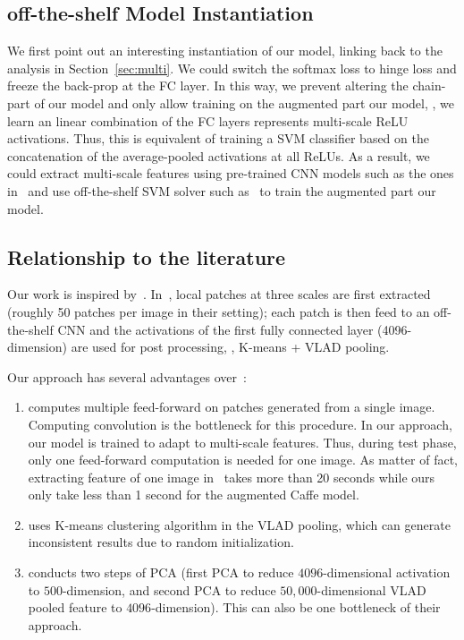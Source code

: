 \documentclass[10pt,twocolumn,letterpaper]{article}
\begin{document}
\subsection{off-the-shelf Model Instantiation}

We first point out an interesting instantiation of our model, linking back to the analysis in Section~\ref{sec:multi}. We could switch the softmax loss to hinge loss and freeze the back-prop at the FC layer. In this way, we prevent altering the chain-part of our model and only allow training on the augmented part our model, \ie, we learn an linear combination of the FC layers represents multi-scale ReLU activations. Thus, this is equivalent of training a SVM classifier based on the concatenation of the average-pooled activations at all ReLUs. As a result, we could extract multi-scale features using pre-trained CNN models such as the ones in~\cite{AlexNet, veryDeep} and use off-the-shelf SVM solver such as~\cite{liblinear} to train the augmented part our model.

\subsection{Relationship to the literature}

Our work is inspired by~\cite{Gong14}. In~\cite{Gong14}, local patches at three scales are first extracted (roughly 50 patches per image in their setting); each patch is then feed to an off-the-shelf CNN and the activations of the first fully connected layer (4096-dimension) are used for post processing, \ie, K-means + VLAD pooling. 

Our approach has several advantages over~\cite{Gong14}:
\begin{enumerate}
\item \cite{Gong14} computes multiple feed-forward on patches generated from a single image. Computing convolution is the bottleneck for this procedure. In our approach, our model is trained to adapt to multi-scale features. Thus, during test phase,
only one feed-forward computation is needed for one image. As matter of fact, extracting feature of one image in~\cite{Gong14} takes more than 20 seconds while ours only take less than 1 second for the augmented Caffe model. 

\item \cite{Gong14} uses K-means clustering algorithm in the VLAD pooling, which can generate inconsistent results due to random initialization. 

\item \cite{Gong14} conducts two steps of PCA (first PCA to reduce $4096$-dimensional activation to $500$-dimension, and second PCA to reduce $50,000$-dimensional VLAD pooled feature to $4096$-dimension). This can also be one bottleneck of their approach. 

\end{enumerate} 
\end{document}
